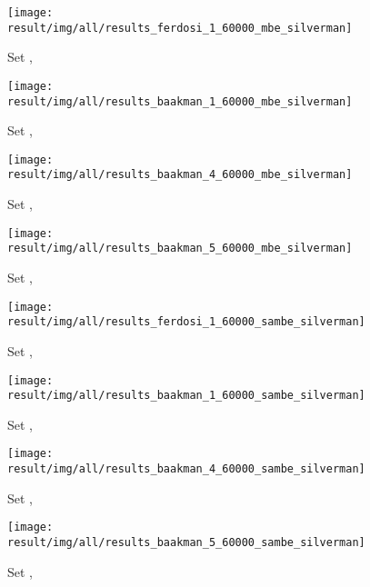 
\begin{subfigure}{0.23\textwidth}
	\centering
	\texttt{[image: result/img/all/results\_ferdosi\_1\_60000\_mbe\_silverman]}
	\caption{Set \ferdosiOne, \mbe}
	\label{fig:4:results:mbe:ferdosi1}
\end{subfigure}
\begin{subfigure}{0.23\textwidth}
	\centering
	\texttt{[image: result/img/all/results\_baakman\_1\_60000\_mbe\_silverman]}
	\caption{Set \baakmanOne, \mbe}
	\label{fig:4:results:mbe:baakman1}
\end{subfigure}
\begin{subfigure}{0.23\textwidth}
	\centering
	\texttt{[image: result/img/all/results\_baakman\_4\_60000\_mbe\_silverman]}
	\caption{Set \baakmanFour, \mbe}
	\label{fig:4:results:mbe:baakman4}
\end{subfigure}	
\begin{subfigure}{0.23\textwidth}
	\centering
	\texttt{[image: result/img/all/results\_baakman\_5\_60000\_mbe\_silverman]}
	\caption{Set \baakmanFive, \mbe}
	\label{fig:4:results:mbe:baakman5}
\end{subfigure}
\begin{subfigure}{0.23\textwidth}
	\centering
	\texttt{[image: result/img/all/results\_ferdosi\_1\_60000\_sambe\_silverman]}
	\caption{Set \ferdosiOne, \sambe}
	\label{fig:4:results:sambe:ferdosi1}
\end{subfigure}
\begin{subfigure}{0.23\textwidth}
	\centering
	\texttt{[image: result/img/all/results\_baakman\_1\_60000\_sambe\_silverman]}
	\caption{Set \baakmanOne, \sambe}
	\label{fig:4:results:sambe:baakman1}
\end{subfigure}
\begin{subfigure}{0.23\textwidth}
	\centering
	\texttt{[image: result/img/all/results\_baakman\_4\_60000\_sambe\_silverman]}
	\caption{Set \baakmanFour, \sambe}
	\label{fig:4:results:sambe:baakman4}
\end{subfigure}		
\begin{subfigure}{0.23\textwidth}
	\centering
	\texttt{[image: result/img/all/results\_baakman\_5\_60000\_sambe\_silverman]}
	\caption{Set \baakmanFive, \sambe}
	\label{fig:4:results:sambe:baakman5}
\end{subfigure}	